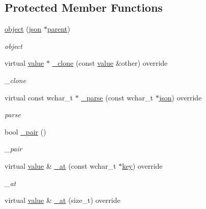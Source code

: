\subsection*{Protected Member Functions}
\begin{DoxyCompactItemize}
\item 
\hyperlink{classformat_1_1object_a458b75773ef8f632e5955fa17ea6eb49}{object} (\hyperlink{classformat_1_1json}{json} $\ast$\hyperlink{classformat_1_1value_a86c03ec8810bfd0d60ec49095120040d}{parent})
\begin{DoxyCompactList}\small\item\em object \end{DoxyCompactList}\item 
virtual \hyperlink{classformat_1_1value_aa6b85823936bf7b8ab78d3f8d443c00d}{value} $\ast$ \hyperlink{classformat_1_1object_ad0de8290132a916e810df0819f6400cb}{\+\_\+clone} (const \hyperlink{classformat_1_1value_aa6b85823936bf7b8ab78d3f8d443c00d}{value} \&other) override
\begin{DoxyCompactList}\small\item\em \+\_\+clone \end{DoxyCompactList}\item 
virtual const wchar\+\_\+t $\ast$ \hyperlink{classformat_1_1object_a6680c7e4b32da5a29d89f2289bb63ee1}{\+\_\+parse} (const wchar\+\_\+t $\ast$\hyperlink{classformat_1_1json}{json}) override
\begin{DoxyCompactList}\small\item\em parse \end{DoxyCompactList}\item 
bool \hyperlink{classformat_1_1object_aac55101129d74838f7181669cdfaa426}{\+\_\+pair} ()
\begin{DoxyCompactList}\small\item\em \+\_\+pair \end{DoxyCompactList}\item 
virtual \hyperlink{classformat_1_1value_aa6b85823936bf7b8ab78d3f8d443c00d}{value} \& \hyperlink{classformat_1_1object_a91e3027c7786c2e24ca3e001f648542d}{\+\_\+at} (const wchar\+\_\+t $\ast$\hyperlink{classformat_1_1value_ad4865e7984fc9f3b5ce7c17fd7ac740c}{key}) override
\begin{DoxyCompactList}\small\item\em \+\_\+at \end{DoxyCompactList}\item 
virtual \hyperlink{classformat_1_1value_aa6b85823936bf7b8ab78d3f8d443c00d}{value} \& \hyperlink{classformat_1_1object_a525bdfa2db22cd6bc21a868a695fe752}{\+\_\+at} (size\+\_\+t) override

\end{DoxyCompactItemize}
